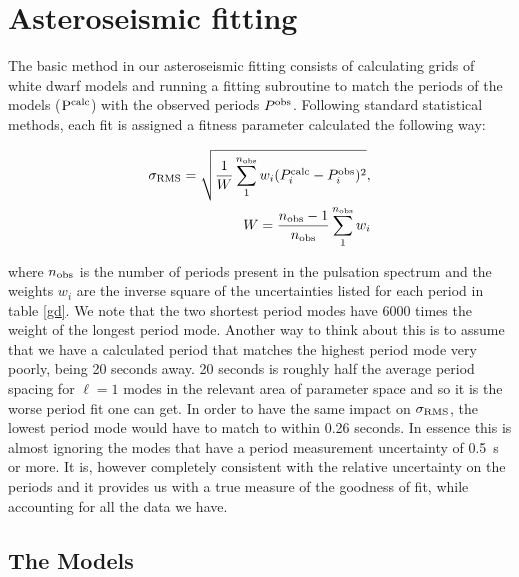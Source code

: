 \documentclass[12pt,preprint]{aastex}
\begin{document}
\section{Asteroseismic fitting}
\label{fitting}

The basic method in our asteroseismic fitting consists of calculating grids of white dwarf models and 
running a fitting subroutine to match the periods of the models ($\rm P^{calc}$) with the observed 
periods $P^{\rm obs}$. Following standard statistical methods, each fit is assigned a fitness 
parameter calculated the following way:

\begin{eqnarray}
\label{fiteq1}
\sigma_{\rm RMS} = \sqrt{\frac{1}{W} \sum_{1}^{n_{\rm obs}} {w_i(P^{\rm calc}_i-P^{\rm obs}_i)^2}}, \\
W=\frac{n_{\rm obs}-1}{n_{\rm obs}}\sum_{1}^{n_{\rm obs}}w_i
\end{eqnarray}

\noindent where $n_{\rm obs}$ is the number of periods present in the pulsation spectrum and the weights $w_i$ 
are the inverse square of the uncertainties listed for each period in table \ref{gd}. We note that the two 
shortest period modes have 6000 times the weight of the longest period mode. Another way to think about this 
is to assume that we have a calculated period that matches the highest period mode very poorly, 
being 20 seconds away. 20 seconds is roughly half the average period spacing for $\ell=1$ modes in the 
relevant area of parameter space and so it is the worse period fit one can get. In order to have the 
same impact on $\sigma_{\rm RMS}$, the lowest period mode would have to match to within 0.26 seconds. 
In essence this is almost ignoring the modes that have a period measurement uncertainty of 0.5~s or more. 
It is, however completely consistent with the relative uncertainty on the periods and it provides us with 
a true measure of the goodness of fit, while accounting for all the data we have.

\subsection{The Models}
\label{models}
\end{document}
